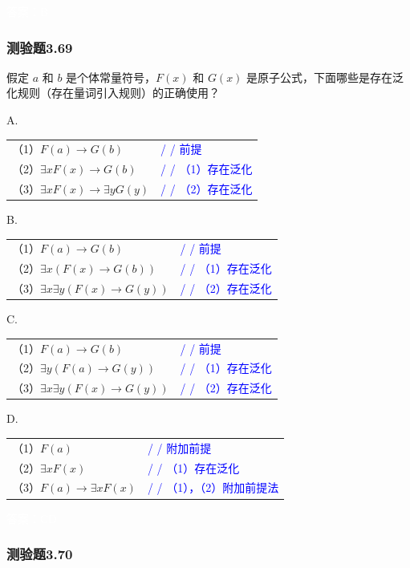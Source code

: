 \documentclass[UTF8, heading=true]{ctexart}
\begin{document}
\textcolor{white}{答案：B}

\subsubsection{测验题3.69}

假定 $a$ 和 $b$ 是个体常量符号，$F(x)$ 和 $G(x)$ 是原子公式，下面哪些是存在泛化规则（存在量词引入规则）的正确使用？


A.

\begin{tabular}{ll}
  （1）$F(a) \rightarrow G(b)$ & \textcolor{blue}{/ / 前提} \\
  （2）$\exists x F(x) \rightarrow G(b)$ & \textcolor{blue}{/ / （1）存在泛化} \\
  （3）$\exists x F(x) \rightarrow \exists y G(y)$ & \textcolor{blue}{/ / （2）存在泛化}
\end{tabular}

B.

\begin{tabular}{ll}
  （1）$F(a) \rightarrow G(b)$ & \textcolor{blue}{/ / 前提} \\
  （2）$\exists x(F(x) \rightarrow G(b))$ & \textcolor{blue}{/ / （1）存在泛化} \\
  （3）$\exists x \exists y(F(x) \rightarrow G(y))$ & \textcolor{blue}{/ / （2）存在泛化}
\end{tabular}

C.

\begin{tabular}{ll}
  （1）$F(a) \rightarrow G(b)$ & \textcolor{blue}{/ / 前提} \\
  （2）$\exists y(F(a) \rightarrow G(y))$ & \textcolor{blue}{/ / （1）存在泛化} \\
  （3）$\exists x \exists y(F(x) \rightarrow G(y))$ & \textcolor{blue}{/ / （2）存在泛化}
\end{tabular}


D.

\begin{tabular}{ll}
  （1）$F(a)$ & \textcolor{blue}{/ / 附加前提} \\
  （2）$\exists x F(x)$ & \textcolor{blue}{/ / （1）存在泛化} \\
  （3）$F(a) \rightarrow \exists x F(x)$ & \textcolor{blue}{/ / （1），（2）附加前提法}
\end{tabular}


\textcolor{white}{答案：CD}


\subsubsection{测验题3.70}
\end{document}
